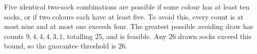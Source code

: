 Five identical two-sock combinations are possible if some colour has at least ten socks, or if two colours each have at least five. To avoid this, every count is at most nine and at most one exceeds four. The greatest possible avoiding draw has counts $9,4,4,4,3,1$, totalling 25, and is feasible. Any 26 drawn socks exceed this bound, so the guarantee threshold is $\boxed{26}$.
